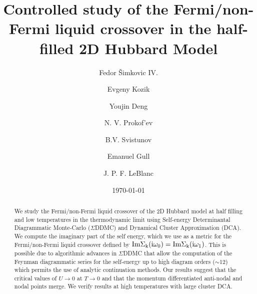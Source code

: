 \documentclass[twocolumn,notitlepage,prl,superscriptaddress,showpacs]{revtex4-1}
\begin{document}
\title{Controlled study of the Fermi/non-Fermi liquid crossover in the half-filled 2D Hubbard Model}

\author{Fedor \v{S}imkovic IV.}
\author{Evgeny Kozik}
\author{Youjin Deng}
\author{N. V. Prokof'ev}
%
\author{B.V. Svistunov}
\author{Emanuel Gull}
\author{J. P. F. LeBlanc}


\date{\today}

\begin{abstract}
We study the Fermi/non-Fermi liquid crossover of the 2D Hubbard model at half filling and low temperatures in the thermodynamic limit using Self-energy Determinantal Diagrammatic Monte-Carlo ($\Sigma$DDMC) and Dynamical Cluster Approximation (DCA). We compute the imaginary part of the self energy, which we use as a metric for the Fermi/non-Fermi liquid crossover defined by $\rm{Im}\Sigma_k (i\omega_0) =\rm{Im}\Sigma_k (i\omega_1)$.
This is possible due to algorithmic advances in $\Sigma$DDMC that allow the computation of the Feynman diagrammatic series for the self-energy up to high diagram orders ($\sim$12) which permits the use of analytic continuation methods.  Our results suggest that the critical values of $U\to 0$ at $T\to 0$ and that the momentum differentiated anti-nodal and nodal points merge.  We verify results at high temperatures with large cluster DCA.  
\end{abstract}

\maketitle
\end{document}
